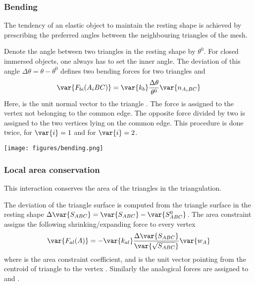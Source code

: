 


\subsubsection*{Bending}
The tendency of an elastic object to maintain the resting shape is achieved by 
prescribing the preferred angles between the neighbouring triangles of the mesh. 

Denote the angle between two triangles in the resting shape by $\theta^0$. For 
closed immersed objects, one always has to set the inner angle. The deviation 
of this angle $\Delta \theta = \theta - \theta^0$ defines two 
bending forces for two triangles  and 
\begin{equation}
\var{F_{bi}(A_iBC)} = \var{k_b}\frac{\Delta \theta}{\theta^0} \var{n_{A_iBC}}
\end{equation}
Here,  is the unit normal vector to the triangle . The 
force  is assigned to the vertex not belonging to the common 
edge. The opposite force divided by two is assigned to the two vertices lying on 
the common edge. This procedure is done twice, for $\var{i}=1$ and for 
$\var{i}=2$.

\begin{center}
  \texttt{[image: figures/bending.png]}
\end{center}



\subsubsection*{Local area conservation}
This interaction conserves the area of the triangles in the triangulation. 

The deviation of the triangle surface  is computed from the triangle 
surface in the resting shape $\Delta \var{S_{ABC}} = \var{S_{ABC}} - \var{S_{ABC}^0}$. 
The area constraint assigns the following shrinking/expanding force to every vertex 
\begin{equation}
 \var{F_{al}(A)} = -\var{k_{al}}\frac{\Delta \var{S_{ABC}}}{\var{\sqrt{S_{ABC}}}}\var{w_{A}}
\end{equation}
where   is the area constraint coefficient, and  is the unit 
vector pointing from the centroid of triangle  to the vertex . 
Similarly the analogical forces are assigned to  and . 


